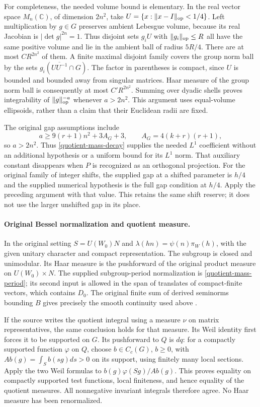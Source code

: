 For completeness, the needed volume bound is elementary.
In the real vector space $M_n(\mathbb C)$, of dimension $2n^2$,
take $U=\{x:\|x-I\|_{\rm op}<1/4\}$.  Left multiplication by
$g\in G$ preserves ambient Lebesgue volume, because its real
Jacobian is $|\det g|^{2n}=1$.  Thus disjoint sets $g_iU$ with
$\|g_i\|_{\rm op}\le R$ all have the same positive volume and lie
in the ambient ball of radius $5R/4$.  There are at most
$C R^{2n^2}$ of them.  A finite maximal disjoint family covers
the group norm ball by the sets
$g_i(\overline{UU^{-1}}\cap G)$.  The factor in parentheses is
compact, since $U$ is bounded and bounded away from singular
matrices.  Haar measure of the group norm ball is consequently
at most $C'R^{2n^2}$.  Summing over dyadic shells proves
integrability of $\|g\|_{\rm op}^{-a}$ whenever $a>2n^2$.
This argument uses equal-volume ellipsoids, rather than a claim
that their Euclidean radii are fixed.

The original gap assumptions include
\[
 a\ge9(r+1)n^2+3A_G+3,
               \qquad A_G=4(k+r)(r+1),
\]
so $a>2n^2$.  Thus \eqref{quotient-mass-decay} supplies the needed
$L^1$ coefficient without an additional hypothesis or a uniform
bound for its $L^1$ norm.  That auxiliary constant disappears when
$P$ is recognized as an orthogonal projection.
For the original family of integer shifts, the supplied gap at a
shifted parameter is $h/4$ and the supplied numerical hypothesis is
the full gap condition at $h/4$.  Apply the preceding argument with
that value.  This retains the same shift reserve; it does not use
the larger unshifted gap in its place.

\paragraph{Original Bessel normalization and quotient measure.}
In the original setting $S=U(W_0)N$ and
$\lambda(hn)=\psi(n)\pi_W(h)$, with the given unitary character
and compact representation.  The subgroup is closed and unimodular.
Its Haar measure is the pushforward of the original product measure
on $U(W_0)\times N$.  The supplied subgroup-period normalization
is \eqref{quotient-mass-period}; its second input is allowed in the
span of translates of compact-finite vectors, which contains $D_0$.
The original finite sum of derived seminorms bounding $B$ gives
precisely the smooth continuity used above
\cite{quotient-mass-original-normalization}.

If the source writes the quotient integral using a measure $\nu$
on matrix representatives, the same conclusion holds for that
measure.  Its Weil identity first forces it to be supported on
$G$.  Its pushforward to $Q$ is $dq$: for a compactly supported
function $\varphi$ on $Q$, choose $b\in C_c(G)$, $b\ge0$, with
$A b(g)=\int_S b(sg)ds>0$ on its support, using finitely many local
sections.  Apply the two Weil formulas to
$b(g)\varphi(Sg)/A b(g)$.  This proves equality on compactly
supported test functions, local finiteness, and hence equality
of the quotient measures.  All nonnegative invariant integrals
therefore agree.  No Haar measure has been renormalized.

